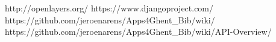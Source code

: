 \begin{thebibliography}{99}

 
 http://openlayers.org/
 https://www.djangoproject.com/
 https://github.com/jeroenarens/Apps4Ghent\_Bib/wiki/
 https://github.com/jeroenarens/Apps4Ghent\_Bib/wiki/API-Overview/

\end{thebibliography}